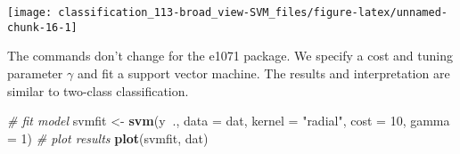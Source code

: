 \documentclass[]{book}
\newenvironment{Shaded}{\begin{snugshade}}{\end{snugshade}}
\newcommand{\CommentTok}[1]{\textcolor[rgb]{0.56,0.35,0.01}{\textit{#1}}}
\newcommand{\DataTypeTok}[1]{\textcolor[rgb]{0.13,0.29,0.53}{#1}}
\newcommand{\DecValTok}[1]{\textcolor[rgb]{0.00,0.00,0.81}{#1}}
\newcommand{\FloatTok}[1]{\textcolor[rgb]{0.00,0.00,0.81}{#1}}
\newcommand{\KeywordTok}[1]{\textcolor[rgb]{0.13,0.29,0.53}{\textbf{#1}}}
\newcommand{\NormalTok}[1]{#1}
\newcommand{\OperatorTok}[1]{\textcolor[rgb]{0.81,0.36,0.00}{\textbf{#1}}}
\newcommand{\StringTok}[1]{\textcolor[rgb]{0.31,0.60,0.02}{#1}}
\begin{document}
\begin{Shaded}
\end{Shaded}

\begin{center}\texttt{[image: classification\_113-broad\_view-SVM\_files/figure-latex/unnamed-chunk-16-1]} \end{center}

The commands don't change for the e1071 package. We specify a cost and tuning parameter
\(\gamma\)
and fit a support vector machine. The results and interpretation are similar to two-class classification.

\begin{Shaded}
\begin{Highlighting}[]
\CommentTok{# fit model}
\NormalTok{svmfit <-}\StringTok{ }\KeywordTok{svm}\NormalTok{(y}\OperatorTok{~}\NormalTok{., }\DataTypeTok{data =}\NormalTok{ dat, }\DataTypeTok{kernel =} \StringTok{"radial"}\NormalTok{, }\DataTypeTok{cost =} \DecValTok{10}\NormalTok{, }\DataTypeTok{gamma =} \DecValTok{1}\NormalTok{)}
\CommentTok{# plot results}
\KeywordTok{plot}\NormalTok{(svmfit, dat)}
\end{Highlighting}
\end{Shaded}
\end{document}
